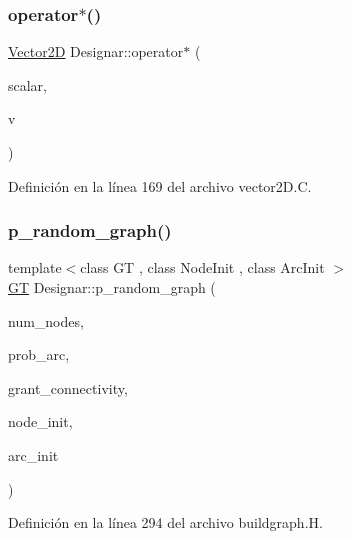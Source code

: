 \subsubsection{\texorpdfstring{operator$\ast$()}{operator*()}}
{\footnotesize\ttfamily \hyperlink{class_designar_1_1_vector2_d}{Vector2D} Designar\+::operator$\ast$ (\begin{DoxyParamCaption}\item[{\hyperlink{namespace_designar_aca2c32af26808dbec1f3a3071fad25ce}{real\+\_\+t}}]{scalar,  }\item[{const \hyperlink{class_designar_1_1_vector2_d}{Vector2D} \&}]{v }\end{DoxyParamCaption})}



Definición en la línea 169 del archivo vector2\+D.\+C.

\mbox{\label{namespace_designar_ad69b4cdb00633579b1ed7b47bd8dc00a}} 
\subsubsection{\texorpdfstring{p\+\_\+random\+\_\+graph()}{p\_random\_graph()}\hspace{0.1cm}{\footnotesize\ttfamily [1/2]}}
{\footnotesize\ttfamily template$<$class GT , class Node\+Init , class Arc\+Init $>$ \\
\hyperlink{demo-buildgraph_8_c_a3001c40d2c31ca87ed96cd7d1334a55e}{GT} Designar\+::p\+\_\+random\+\_\+graph (\begin{DoxyParamCaption}\item[{\hyperlink{namespace_designar_aa72662848b9f4815e7bf31a7cf3e33d1}{nat\+\_\+t}}]{num\+\_\+nodes,  }\item[{\hyperlink{namespace_designar_aca2c32af26808dbec1f3a3071fad25ce}{real\+\_\+t}}]{prob\+\_\+arc,  }\item[{bool}]{grant\+\_\+connectivity,  }\item[{Node\+Init \&}]{node\+\_\+init,  }\item[{Arc\+Init \&}]{arc\+\_\+init }\end{DoxyParamCaption})}



Definición en la línea 294 del archivo buildgraph.\+H.

\mbox{\label{namespace_designar_a55d69e396be9526992246c78526d7c36}} 

